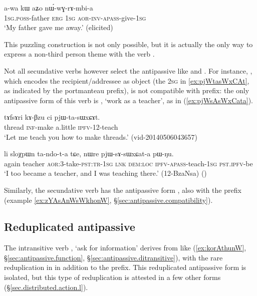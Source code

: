  \begin{exe}
\ex \label{ex:nWwGrAmbia2}
\gll  a-wa kɯ aʑo nɯ́-wɣ-rɤ-mbi-a \\
\textsc{1sg}.\textsc{poss}-father \textsc{erg} \textsc{1sg} \textsc{aor}-\textsc{inv}-\textsc{apass}-give-\textsc{1sg} \\
\glt `My father gave me away.' (elicited)
\end{exe}

This puzzling construction is not only possible, but it is actually the only way to express a non-third person theme with the verb .
 
Not all secundative verbs however select the  antipassive like  and  . For instance, , which encodes the recipient/addressee as object (the \textsc{2sg} in \ref{ex:pjWtasWxCAt}, as indicated by the  portmanteau prefix), is not compatible with  prefix: the only antipassive form of this verb is , `work as a teacher', as in (\ref{ex:pjWsAsWxCata}).

\begin{exe}
\ex \label{ex:pjWtasWxCAt}
\gll tɤfsɤri kɤ-βzu ci pjɯ-ta-sɯxɕɤt. \\
thread \textsc{inf}-make a.little \textsc{ipfv}-1\fl{}2-teach \\
\glt `Let me teach you how to make threads.' (vid-20140506043657)
\end{exe}

\begin{exe}
\ex \label{ex:pjWsAsWxCata}
\gll li sloχpɯn ta-ndo-t-a tɕe, nɯre pjɯ-sɤ-sɯxɕat-a pɯ-ŋu. \\
again teacher \textsc{aor}:3\flobv{}-take-\textsc{pst}:\textsc{tr}-\textsc{1sg} \textsc{lnk} \textsc{dem}:\textsc{loc} \textsc{ipfv}-\textsc{apass}-teach-\textsc{1sg} \textsc{pst}.\textsc{ipfv}-be \\
\glt `I too became a teacher, and I was teaching there.' (12-BzaNsa) ()
\end{exe} 

Similarly, the secundative verb  has the antipassive form , also with the  prefix (example \ref{ex:zYAsAnWsWkhonW}, §\ref{sec:antipassive.compatibility}).

 \subsection{Reduplicated antipassive} \label{sec:antipassive.redp}
The intransitive verb , `ask for information' derives from  like  (\ref{ex:korAthunW}, §\ref{sec:antipassive.function}, §\ref{sec:antipassive.ditransitive}), with the rare reduplication in  in addition to the  prefix. This reduplicated antipassive form is isolated, but this type of reduplication is attested in a few other forms (§\ref{sec.distributed.action.l}).

